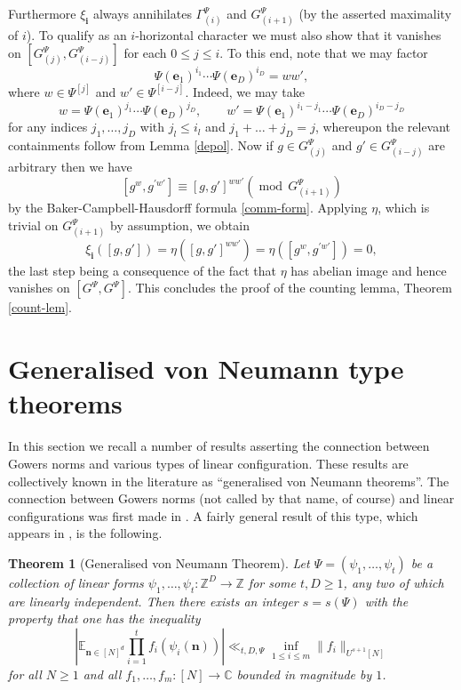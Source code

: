\documentclass[11pt,reqno]{amsart}
\numberwithin{equation}{section}
\theoremstyle{plain}
\newtheorem{theorem}[subsection]{Theorem}
\theoremstyle{definition}
\renewcommand{\leq}{\leqslant}
\renewcommand{\geq}{\geqslant}
\newcommand{\md}[1]{\ensuremath{(\operatorname{mod}\, #1)}}
\newcommand\E{{\mathbb{E}}}
\newcommand\Z{\mathbb{Z}}
\newcommand\C{\mathbb{C}}
\newcommand\1{{\bf 1}}
\newcommand\2{{\bf 2}}
\begin{document}
Furthermore $\xi_{\mathbf{i}}$ always annihilates $\Gamma^{\Psi}_{(i)}$ and $G^{\Psi}_{(i+1)}$ (by the asserted maximality of $i$). To qualify as an $i$-horizontal character we must also show that it vanishes on $[G^{\Psi}_{(j)}, G^{\Psi}_{(i-j)}]$ for each $0 \leq j \leq i$. To this end, note that we may factor
\[  \Psi(\mathbf{e}_1)^{i_1} \cdots \Psi(\mathbf{e}_D)^{i_D}= w w',\]
where $w \in \Psi^{[j]}$ and $w' \in \Psi^{[i-j]}$. Indeed, we may take
\[ w = \Psi(\mathbf{e}_1)^{j_1} \cdots \Psi(\mathbf{e}_D)^{j_D}, \qquad w' = \Psi(\mathbf{e}_1)^{i_1 - j_1} \cdots \Psi(\mathbf{e}_D)^{i_D -j_D}\] for any indices $j_1,\dots,j_D$ with $j_l \leq i_l$ and $j_1 + \dots + j_D = j$, whereupon the relevant containments follow from Lemma \ref{depol}.
Now if $g \in G^{\Psi}_{(j)}$ and $g' \in G^{\Psi}_{(i-j)}$ are arbitrary then we have
\[ [ g^w, g^{\prime w'}] \equiv [g,g']^{w w'} \md{G^{\Psi}_{(i+1)}}\] by the Baker-Campbell-Hausdorff formula \eqref{comm-form}. Applying $\eta$, which is trivial on $G^{\Psi}_{(i+1)}$ by assumption, we obtain
\[ \xi_{\mathbf{i}}([g,g']) = \eta ([g,g']^{w w'}) = \eta ([ g^w, g^{\prime w'} ]) = 0,\] the last step being a consequence of the fact that $\eta$ has abelian image and hence vanishes on $[G^{\Psi}, G^{\Psi}]$. This concludes the proof of the counting lemma, Theorem \ref{count-lem}.



\section{Generalised von Neumann type theorems}\label{gvn-sec}

In this section we recall a number of results asserting the connection between Gowers norms and various types of linear configuration. These results are collectively known in the literature as ``generalised von Neumann theorems''. The connection between Gowers norms (not called by that name, of course) and linear configurations was first made in \cite{gowers-4aps}.  A fairly general result of this type, which appears in \cite{green-tao-linearprimes}, is the following.

\begin{theorem}[Generalised von Neumann Theorem]\label{cs-lemma}  Let $\Psi = (\psi_1,\ldots,\psi_t)$ be a collection of linear forms $\psi_1,\ldots,\psi_t: \Z^D \to \Z$ for some $t,D \geq 1$, any two of which are linearly independent.  Then there exists an integer $s = s(\Psi)$ with the property that one has the inequality
\begin{equation}\label{end}
| \E_{\mathbf{n} \in [N]^d} \prod_{i=1}^t f_i( \psi_i(\mathbf{n}) )| 
\ll_{t,D,\Psi} \inf_{1 \leq i \leq m} \|f_i\|_{U^{s+1}[N]}
\end{equation}
for all $N \geq 1$ and all $f_1,\ldots,f_m: [N] \to \C$ bounded in magnitude by $1$.  
\end{theorem}
\end{document}

